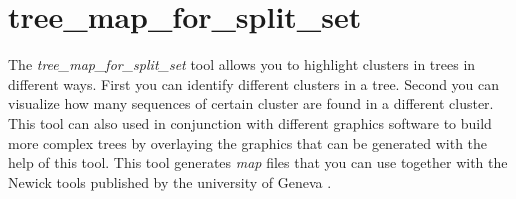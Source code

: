 \section{tree\_map\_for\_split\_set} \label{sec-treemapss}

The \emph{tree\_map\_for\_split\_set} tool allows you to highlight
clusters in trees in different ways. First you can identify different
clusters in a tree. Second you can visualize how many sequences of
certain cluster are found in a different cluster. This tool can also
used in conjunction with different graphics software to build more
complex trees by overlaying the graphics that can be generated with
the help of this tool. This tool generates \emph{map} files that you
can use together with the Newick tools published by the university of
Geneva \cite{newick_tools}.

